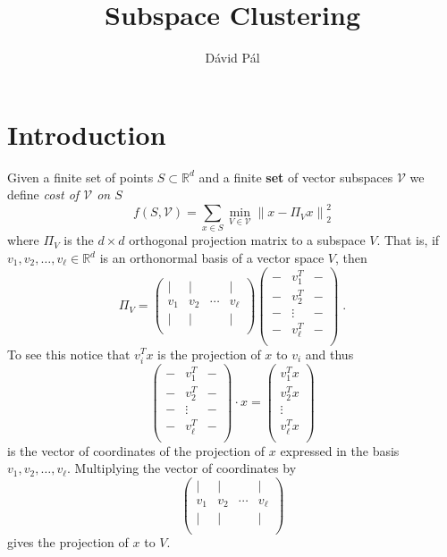 \documentclass{article}
\newcommand{\R}{\mathbb{R}}
\newcommand{\V}{\mathcal{V}}
\newcommand{\norm}[1]{\left\|#1\right\|}
\begin{document}
\title{Subspace Clustering}
\author{D\'avid P\'al}
\maketitle

\section{Introduction}

Given a finite set of points $S \subset \R^d$ and a finite \textbf{set} of
vector subspaces $\V$ we define \emph{cost of $\V$ on $S$}
$$
f(S, \V) = \sum_{x \in S} \min_{V \in \V} \norm{x - \Pi_V x}_2^2
$$
where $\Pi_V$ is the $d\times d$ orthogonal projection matrix to a subspace $V$.
That is, if $v_1, v_2, \dots, v_\ell \in \R^d$ is an orthonormal basis
of a vector space $V$, then
$$
\Pi_V =
\begin{pmatrix}
\vert & \vert &  & \vert \\
v_1 & v_2 & \cdots & v_\ell \\
\vert & \vert &  & \vert \\
\end{pmatrix}
\begin{pmatrix}
- & v_1^T & - \\
- & v_2^T & - \\
- & \vdots & - \\
- & v_\ell^T & - \\
\end{pmatrix} \; .
$$
To see this notice that $v_i^T x$ is the projection of $x$ to $v_i$
and thus
$$
\begin{pmatrix}
- & v_1^T & - \\
- & v_2^T & - \\
- & \vdots & - \\
- & v_\ell^T & - \\
\end{pmatrix} \cdot x
=
\begin{pmatrix}
v_1^T x \\
v_2^T x \\
\vdots  \\
v_\ell^T x \\
\end{pmatrix}
$$
is the vector of coordinates of the projection of $x$ expressed in the basis $v_1, v_2, \dots, v_{\ell}$.
Multiplying the vector of coordinates by
$$
\begin{pmatrix}
\vert & \vert &  & \vert \\
v_1 & v_2 & \cdots & v_\ell \\
\vert & \vert &  & \vert \\
\end{pmatrix}
$$
gives the projection of $x$ to $V$.
\end{document}
